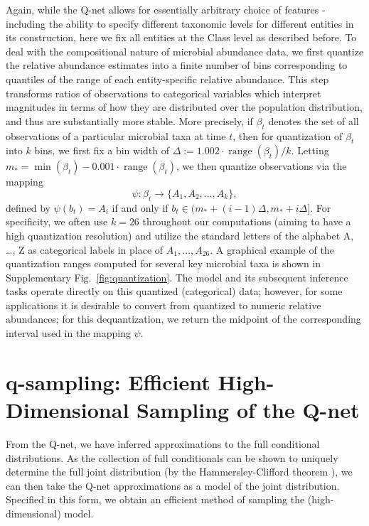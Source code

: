 \documentclass[onecolumn,10pt]{IEEEtran}
\def\qnet{Q-net\xspace}
\def\qsamp{q-sampling\xspace}
\def\SPREFIX{S-}
\def\SPREFIX{}
\def\SUPPLEMENTARY{Supplementary\xspace}
\begin{document}
Again, while the \qnet allows for essentially arbitrary choice of features - including the ability to specify different taxonomic levels for different entities in its construction,  here we fix all entities at the Class level as described before.  To deal with the compositional nature of microbial abundance data, we first quantize the relative abundance estimates into a finite number of bins corresponding to quantiles of the range of each entity-specific relative abundance. This step transforms ratios of observations to categorical variables which interpret magnitudes in terms of how they are distributed over the  population distribution, and thus are substantially more stable. 
More precisely, if $\beta_t$ denotes the set of all observations of a particular microbial taxa at time $t$, then for quantization of $\beta_t$ into $k$ bins, we first fix a bin width of $\Delta := 1.002\cdot\operatorname{range}(\beta_t)/k$.  Letting $m_* = \operatorname{min}(\beta_t) - 0.001\cdot\operatorname{range}(\beta_t)$, we then quantize observations via the mapping \[ \psi: \beta_t \to \{A_1, A_2, \ldots, A_k\},\] defined by $\psi(b_t) = A_i$ if and only if $b_t \in (m_* + (i-1)\Delta, m_* + i\Delta]$. For specificity, we often use $k=26$ throughout our computations (aiming to have a high quantization resolution) and utilize the standard letters of the alphabet A, \ldots, Z as categorical labels in place of $A_1,\ldots,A_{26}$. A graphical example of the quantization ranges computed for several key microbial taxa is shown in \SUPPLEMENTARY Fig.~\SPREFIX\ref{fig:quantization}. The model and its subsequent inference tasks operate directly on this quantized (categorical) data; however, for some applications it is desirable to convert from quantized to numeric relative abundances; for this dequantization, we return the midpoint of the corresponding interval used in the mapping $\psi$.

\section{\qsamp: Efficient High-Dimensional Sampling of the \qnet}
\label{sec:qsamp}

From the \qnet, we have inferred approximations to the full conditional distributions.  As the collection of full conditionals can be shown to uniquely determine the full joint distribution (by the Hammersley-Clifford theorem \cite{besag1974spatial}), we can then take the \qnet approximations as a model of the joint distribution.  Specified in this form, we obtain an efficient method of sampling the (high-dimensional) model.
\end{document}
